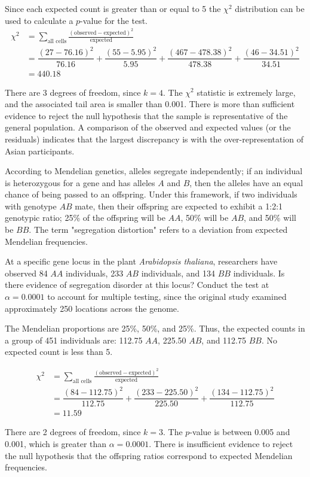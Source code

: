 \begin{example}
Since each expected count is greater than or equal to 5 the  $\chi^2$ distribution can be used to calculate a $p$-value for the test.
\begin{align*}
\chi^2 &= \sum_{\text{all cells}} \frac{(\text{observed} - \text{expected})^2}{\text{expected}} \\
&= \dfrac{(27-76.16)^2}{76.16} + \dfrac{(55-5.95)^2}{5.95} + \dfrac{(467-478.38)^2}{478.38} + \dfrac{(46-34.51)^2}{34.51} \\
&=440.18
\end{align*}	

There are 3 degrees of freedom, since $k = 4$. The $\chi^2$ statistic is extremely large, and the associated tail area is smaller than 0.001. There is more than sufficient evidence to reject the null hypothesis that the sample is representative of the general population. A comparison of the observed and expected values (or the residuals) indicates that the largest discrepancy is with the over-representation of Asian participants.
\end{example}


\begin{example}{According to Mendelian genetics, alleles segregate independently; if an individual is heterozygous for a gene and has alleles $A$ and $B$, then the alleles have an equal chance of being passed to an offspring. Under this framework, if two individuals with genotype $AB$ mate, then their offspring are expected to exhibit a 1:2:1 genotypic ratio; 25\% of the offspring will be $AA$, 50\% will be $AB$, and 50\% will be $BB$. The term "segregation distortion" refers to a deviation from expected Mendelian frequencies. 
		
At a specific gene locus in the plant \textit{Arabidopsis thaliana}, researchers have observed 84 $AA$ individuals, 233 $AB$ individuals, and 134 $BB$ individuals. Is there evidence of segregation disorder at this locus? Conduct the test at $\alpha = 0.0001$ to account for multiple testing, since the original study examined approximately 250 locations across the genome. 
}

The Mendelian proportions are 25\%, 50\%, and 25\%. Thus, the expected counts in a group of 451 individuals are: 112.75 $AA$, 225.50 $AB$, and 112.75 $BB$. No expected count is less than 5.

\begin{align*}
\chi^2 &= \sum_{\text{all cells}} \frac{(\text{observed} - \text{expected})^2}{\text{expected}} \\
&= \dfrac{(84-112.75)^2}{112.75} + \dfrac{(233-225.50)^2}{225.50} + \dfrac{(134-112.75)^2}{112.75}\\
&=11.59
\end{align*}

There are 2 degrees of freedom, since $k = 3$. The $p$-value is between 0.005 and 0.001, which is greater than $\alpha = 0.0001$. There is insufficient evidence to reject the null hypothesis that the offspring ratios correspond to expected Mendelian frequencies.
\end{example}

